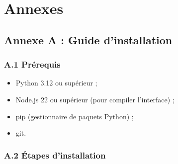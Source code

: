 \documentclass[12pt, a4paper, oneside]{report}
\begin{document}









\printbibliography[heading=bibintoc, title={Bibliographie}]


\appendix

\chapter*{Annexes}

\section*{Annexe A : Guide d'installation}

\subsection*{A.1 Prérequis}

\begin{itemize}
  \item Python 3.12 ou supérieur ;
  \item Node.js 22 ou supérieur (pour compiler l'interface) ;
  \item pip (gestionnaire de paquets Python) ;
  \item git.
\end{itemize}

\subsection*{A.2 Étapes d'installation}
\end{document}
